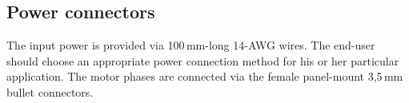 \subsection{Power connectors}
The input power is provided via 100\,mm-long 14-AWG wires. The end-user should choose an appropriate power
connection method for his or her particular application.
The motor phases are connected via the female panel-mount 3,5\,mm bullet connectors. 

\newpage

